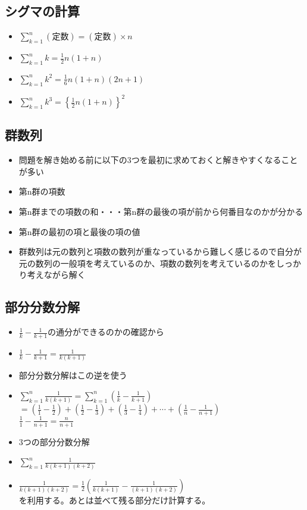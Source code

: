\documentclass[twocolumn, 25pt]{jarticle}
\begin{document}
\subsection{シグマの計算}
\begin{itemize}
  \item $\displaystyle \sum_{k = 1}^{n} (定数) = (定数)\times n$
  \item $\displaystyle \sum_{k = 1}^{n} k = \frac{1}{2}n(1 + n)$
  \item $\displaystyle \sum_{k = 1}^{n} k^2 = \frac{1}{6}n(1 + n)(2n+1)$
  \item $\displaystyle \sum_{k = 1}^{n} k^3 = \left\{\frac{1}{2}n(1 + n)\right\}^2$
\end{itemize}
\subsection{群数列}
\begin{itemize}
  \item 問題を解き始める前に以下の$3$つを最初に求めておくと解きやすくなることが多い
  \item 第n群の項数
  \item 第n群までの項数の和・・・第n群の最後の項が前から何番目なのかが分かる
  \item 第n群の最初の項と最後の項の値
  \item 群数列は元の数列と項数の数列が重なっているから難しく感じるので自分が元の数列の一般項を考えているのか、項数の数列を考えているのかをしっかり考えながら解く
\end{itemize}
\subsection{部分分数分解}
\begin{itemize}
  \item $\displaystyle \frac{1}{k} - \frac{1}{k + 1}$の通分ができるのかの確認から
  \item $\displaystyle \frac{1}{k} - \frac{1}{k + 1} = \frac{1}{k(k + 1)}$
  \item 部分分数分解はこの逆を使う
  \item $\displaystyle \sum_{k = 1}^{n} \frac{1}{k(k + 1)} = \sum_{k = 1}^{n} (\frac{1}{k} - \frac{1}{k + 1}) $ \\ $\displaystyle= (\frac{1}{1} - \frac{1}{2}) + (\frac{1}{2} - \frac{1}{3}) + (\frac{1}{3} - \frac{1}{4}) + \cdots + (\frac{1}{n} - \frac{1}{n + 1}) $\\ $\displaystyle \frac{1}{1} - \frac{1}{n + 1} = \frac{n}{n + 1}$
  \item $3$つの部分分数分解
  \item $\displaystyle \sum_{k = 1}^{n}\frac{1}{k(k+1)(k + 2)}$
  \item $\displaystyle \frac{1}{k(k+1)(k + 2)} = \frac{1}{2}(\frac{1}{k(k + 1)} - \frac{1}{(k+1)(k + 2)})$\\を利用する。あとは並べて残る部分だけ計算する。
\end{itemize}
\end{document}
